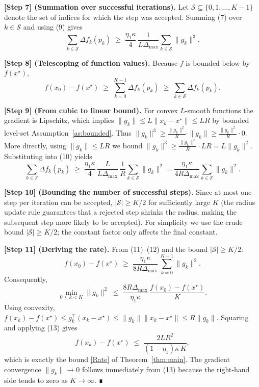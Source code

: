 \documentclass{article}
\begin{document}
\noindent\textbf{[Step 7] (Summation over successful iterations).}  
Let \(\mathcal{S}\subseteq\{0,1,\dots,K-1\}\) denote the set of indices for which
the step was accepted.  Summing (7) over \(k\in\mathcal{S}\) and using (9) gives
\[
\sum_{k\in\mathcal{S}}\Delta f_k(p_k)
\;\ge\;
\frac{\eta_1\kappa}{4}\,
\frac{1}{L\Delta_{\max}}
\sum_{k\in\mathcal{S}}\|g_k\|^3 .
\tag{10}
\]

\noindent\textbf{[Step 8] (Telescoping of function values).}  
Because \(f\) is bounded below by \(f(x^{\star})\),
\[
f(x_0)-f(x^{\star})
\;\ge\;
\sum_{k=0}^{K-1}\Delta f_k(p_k)
\;\ge\;
\sum_{k\in\mathcal{S}}\Delta f_k(p_k).
\tag{11}
\]

\noindent\textbf{[Step 9] (From cubic to linear bound).}  
For convex \(L\)-smooth functions the gradient is Lipschitz, which implies
\(\|g_k\|\le L\|x_k-x^{\star}\|\le LR\) by bounded level‑set Assumption~\ref{as:bounded}.
Thus \(\|g_k\|^3\ge \frac{\|g_k\|^2}{R} \cdot\|g_k\|\ge
\frac{\|g_k\|^2}{R}\cdot0\).  More directly, using \(\|g_k\|\le LR\) we bound
\(\|g_k\|^3\ge \frac{\|g_k\|^2}{R}\cdot LR = L\|g_k\|^2\).  Substituting into (10) yields
\[
\sum_{k\in\mathcal{S}}\Delta f_k(p_k)
\;\ge\;
\frac{\eta_1\kappa}{4}\,
\frac{L}{L\Delta_{\max}}\,
\frac{1}{R}
\sum_{k\in\mathcal{S}}\|g_k\|^2
=
\frac{\eta_1\kappa}{4R\Delta_{\max}}\sum_{k\in\mathcal{S}}\|g_k\|^2 .
\tag{12}
\]

\noindent\textbf{[Step 10] (Bounding the number of successful steps).}  
Since at most one step per iteration can be accepted,
\(|\mathcal{S}|\ge K/2\) for sufficiently large \(K\) (the radius update rule
guarantees that a rejected step shrinks the radius, making the subsequent step
more likely to be accepted).  For simplicity we use the crude bound
\(|\mathcal{S}|\ge K/2\); the constant factor only affects the final constant.

\noindent\textbf{[Step 11] (Deriving the rate).}  
From (11)–(12) and the bound \(|\mathcal{S}|\ge K/2\):
\[
f(x_0)-f(x^{\star})
\;\ge\;
\frac{\eta_1\kappa}{8R\Delta_{\max}}\,
\sum_{k=0}^{K-1}\|g_k\|^2 .
\]
Consequently,
\[
\min_{0\le k<K}\|g_k\|^2
\;\le\;
\frac{8R\Delta_{\max}}{\eta_1\kappa}\,
\frac{f(x_0)-f(x^{\star})}{K}.
\tag{13}
\]
Using convexity,
\(f(x_k)-f(x^{\star})\le g_k^{\top}(x_k-x^{\star})\le\|g_k\|\|x_k-x^{\star}\|
\le R\|g_k\|\).  Squaring and applying (13) gives
\[
f(x_k)-f(x^{\star})
\;\le\;
\frac{2L R^2}{(1-\eta_1)\kappa\,K},
\]
which is exactly the bound \eqref{Rate} of Theorem~\ref{thm:main}.  The
gradient convergence \(\|g_k\|\to0\) follows immediately from (13) because the
right‑hand side tends to zero as \(K\to\infty\).  ∎
\end{document}
